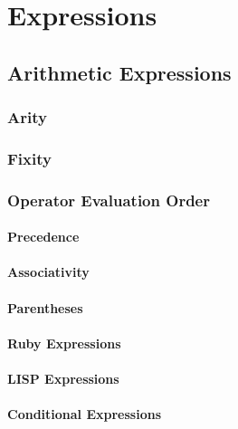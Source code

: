 \section{Expressions}\label{sec:Expressions}
\subsection{Arithmetic Expressions}\label{subsec:Arithmetic_Expressions}
\subsubsection{Arity}\label{subsubsec:Operator_Arity} %
\subsubsection{Fixity}\label{subsubsec:Operator_Fixity} %
\subsubsection{Operator Evaluation Order}\label{subsubsec:Operator_Evaluation_Order}
\paragraph{Precedence}\label{par:Operator_Evaluation_Order-Precedence}
\paragraph{Associativity}\label{par:Operator_Evaluation_Order-Associativity}
\paragraph{Parentheses}\label{par:Operator_Evaluation_Order-Parentheses}
\paragraph{Ruby Expressions}\label{par:Operator_Evaluation_Order-Ruby_Expressions}
\paragraph{LISP Expressions}\label{par:Operator_Evaluation_Order-LISP_Expressions}
\paragraph{Conditional Expressions}\label{par:Operator_Evaluation_Order-Conditional_Expressions}

